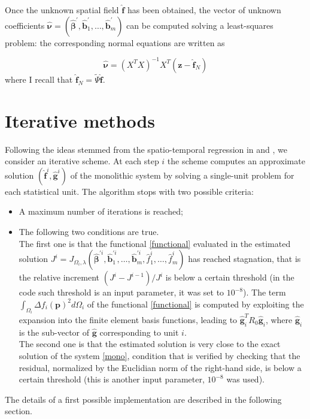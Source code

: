 Once the unknown spatial field $\hat{\bm{f}}$ has been obtained, the vector of unknown coefficients $\hat{\bm{\nu}} = (\hat{\bm{\beta}}^\prime, \hat{\bm{b}}_1^\prime, \dots, \hat{\bm{b}}_m^\prime)$ can be computed solving a least-squares problem: the corresponding normal equations are written as
    
\begin{equation}
    \label{nu}
    \hat{\bm{\nu}} = \left(X^TX\right)^{-1}X^T\left(\bm{z} - \hat{\bm{f}}_N\right)
\end{equation}
where I recall that $\hat{\bm{f}}_N = \tilde{\Psi} \hat{\bm{f}}$.

\section{Iterative methods}

Following the ideas stemmed from the spatio-temporal regression in \citeauthor{pollini} \cite{pollini} and \citeauthor{massardi} \cite{massardi}, we consider an iterative scheme. At each step $i$ the scheme computes an approximate solution $(\hat{\mathbf{f}}^{i},\hat{\mathbf{g}}^{i})$ of the monolithic system by solving a single-unit problem for each statistical unit.
The algorithm stops with two possible criteria:
\begin{itemize}
    \item A maximum number of iterations is reached;
    \item The following two conditions are true. \\
    The first one is that the functional \ref{functional} evaluated in the estimated solution $J^i = J_{\Omega_i, \lambda}\left( \hat{\bm{\beta}}^{\prime i}, \hat{\bm{b}}^{\prime i}_1, \dots, \hat{\bm{b}}^{\prime i}_m, \hat{f}_1^i, \dots, \hat{f}_m^i \right)$ has reached stagnation, that is the relative increment $\left( J^i - J^{i-1}\right) / J^i$ is below a certain threshold (in the code such threshold is an input parameter, it was set to $10^{-8}$). The term $ \int_{\Omega_i} \Delta f_i \left(\bm{p}\right)^2 d\Omega_i $ of the functional \ref{functional} is computed by exploiting the expansion into the finite element basis functions, leading to $\hat{\bm{g}}_i^T R_0 \hat{\bm{g}}_i$, where $\hat{\bm{g}}_i $ is the sub-vector of $\hat{\bm{g}}$ corresponding to unit $i$.\\
    The second one is that the estimated solution is very close to the exact solution of the system \ref{mono}, condition that is verified by checking that the residual, normalized by the Euclidian norm of the right-hand side, is below a certain threshold (this is another input parameter, $10^{-8}$ was used).
\end{itemize}
The details of a first possible implementation are described in the following section.

